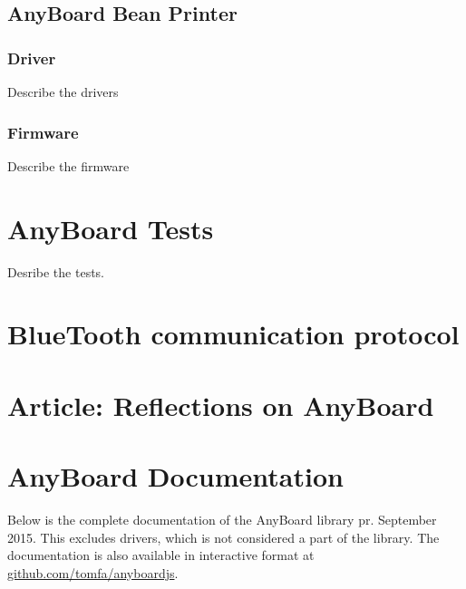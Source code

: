 \section{AnyBoard Bean Printer} \label{appendix:anyboard_bean_printer}
\subsection{Driver}
Describe the drivers
\subsection{Firmware}
Describe the firmware
\newpage
\chapter{AnyBoard Tests} \label{appendix:tests}

Desribe the tests.

\newpage
\chapter{BlueTooth communication protocol}


\chapter{Article: Reflections on AnyBoard} \label{appendix:article}



\chapter{AnyBoard Documentation} \label{appendix:doc}

Below is the complete documentation of the AnyBoard library pr. September 2015. This excludes drivers, which is not considered a part of the library. The documentation is also available in interactive format at \href{https://github.com/tomfa/anyboardjs/}{github.com/tomfa/anyboardjs}.


\newpage
